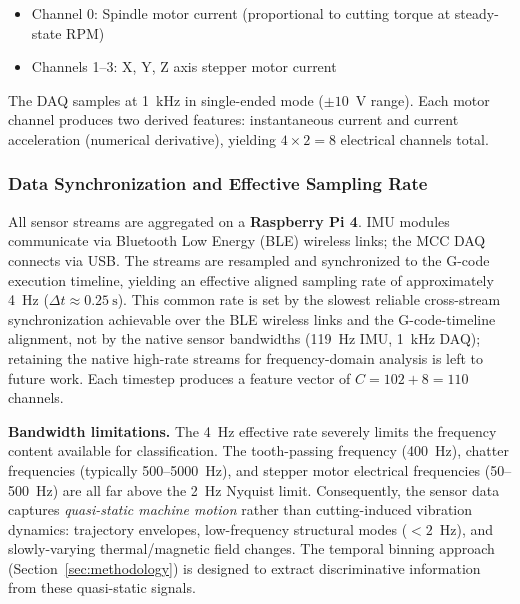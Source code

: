 \begin{itemize}
    \item Channel 0: Spindle motor current (proportional to cutting torque at steady-state RPM)
    \item Channels 1--3: X, Y, Z axis stepper motor current
\end{itemize}

The DAQ samples at \SI{1}{\kilo\hertz} in single-ended mode ($\pm 10$~V range). Each motor channel produces two derived features: instantaneous current and current acceleration (numerical derivative), yielding $4 \times 2 = 8$ electrical channels total.

\subsubsection{Data Synchronization and Effective Sampling Rate}\label{sec:sampling}

All sensor streams are aggregated on a \textbf{Raspberry Pi 4}. IMU modules communicate via Bluetooth Low Energy (BLE) wireless links; the MCC DAQ connects via USB. The streams are resampled and synchronized to the G-code execution timeline, yielding an effective aligned sampling rate of approximately \SI{4}{\hertz} ($\Delta t \approx \SI{0.25}{\second}$). This common rate is set by the slowest reliable cross-stream synchronization achievable over the BLE wireless links and the G-code-timeline alignment, not by the native sensor bandwidths (\SI{119}{\hertz} IMU, \SI{1}{\kilo\hertz} DAQ); retaining the native high-rate streams for frequency-domain analysis is left to future work. Each timestep produces a feature vector of $C = 102 + 8 = 110$ channels.

\textbf{Bandwidth limitations.} The \SI{4}{\hertz} effective rate severely limits the frequency content available for classification. The tooth-passing frequency (\SI{400}{\hertz}), chatter frequencies (typically \SI{500}{}--\SI{5000}{\hertz}), and stepper motor electrical frequencies (\SI{50}{}--\SI{500}{\hertz}) are all far above the \SI{2}{\hertz} Nyquist limit. Consequently, the sensor data captures \emph{quasi-static machine motion} rather than cutting-induced vibration dynamics: trajectory envelopes, low-frequency structural modes ($< 2$~Hz), and slowly-varying thermal/magnetic field changes. The temporal binning approach (Section~\ref{sec:methodology}) is designed to extract discriminative information from these quasi-static signals.

